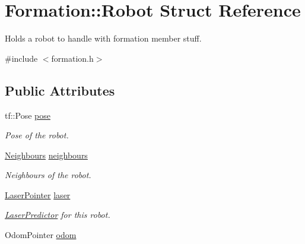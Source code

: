 \hypertarget{structFormation_1_1Robot}{}\section{Formation\+:\+:Robot Struct Reference}
\label{structFormation_1_1Robot}


Holds a robot to handle with formation member stuff.  




{\ttfamily \#include $<$formation.\+h$>$}

\subsection*{Public Attributes}
\begin{DoxyCompactItemize}
\item 
tf\+::\+Pose \hyperlink{structFormation_1_1Robot_a63752bb5263e86b35e8f28f3c5948c88}{pose}\hypertarget{structFormation_1_1Robot_a63752bb5263e86b35e8f28f3c5948c88}{}\label{structFormation_1_1Robot_a63752bb5263e86b35e8f28f3c5948c88}

\begin{DoxyCompactList}\small\item\em Pose of the robot. \end{DoxyCompactList}\item 
\hyperlink{classFormation_a174a86b886bea3cb5d2c60526e73074d}{Neighbours} \hyperlink{structFormation_1_1Robot_a1a1dad64a86cf61f9c2633952a900b69}{neighbours}\hypertarget{structFormation_1_1Robot_a1a1dad64a86cf61f9c2633952a900b69}{}\label{structFormation_1_1Robot_a1a1dad64a86cf61f9c2633952a900b69}

\begin{DoxyCompactList}\small\item\em Neighbours of the robot. \end{DoxyCompactList}\item 
\hyperlink{classFormation_a57c79726ce19c016f8cb19ebe1b7f379}{Laser\+Pointer} \hyperlink{structFormation_1_1Robot_a01aa4b4c32c01bf74210d6e720815d33}{laser}\hypertarget{structFormation_1_1Robot_a01aa4b4c32c01bf74210d6e720815d33}{}\label{structFormation_1_1Robot_a01aa4b4c32c01bf74210d6e720815d33}

\begin{DoxyCompactList}\small\item\em \hyperlink{classLaserPredictor}{Laser\+Predictor} for this robot. \end{DoxyCompactList}\item 
Odom\+Pointer \hyperlink{structFormation_1_1Robot_a0b912dd3ce3e56cdc66261a981f7dc39}{odom}\hypertarget{structFormation_1_1Robot_a0b912dd3ce3e56cdc66261a981f7dc39}{}\label{structFormation_1_1Robot_a0b912dd3ce3e56cdc66261a981f7dc39}


\end{DoxyCompactItemize}
